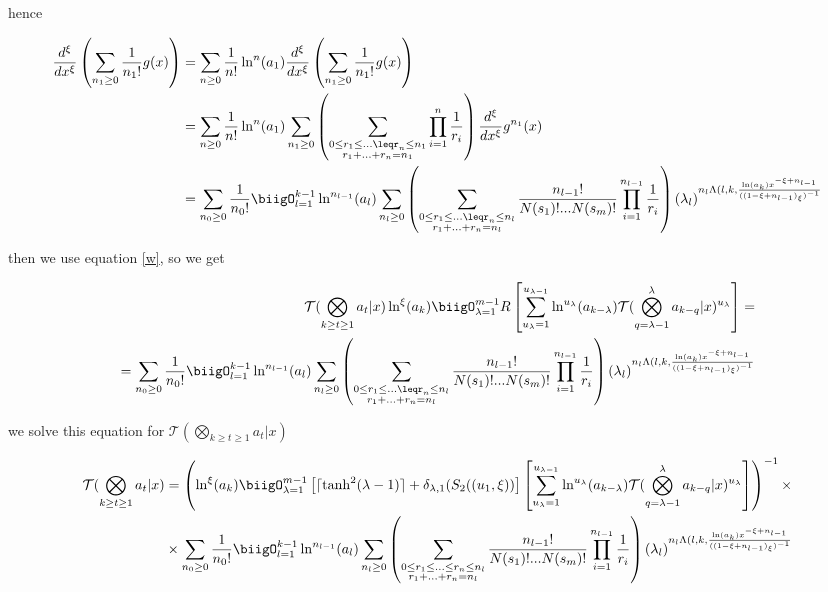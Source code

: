hence

\begin{align}
        \frac{d^\xi}{dx^\xi}\left(\sum_{n_1\geq0}\frac{1}{n_1!}g(x)\right) 
        &=\sum_{n\geq0}\frac{1}{n!}\ln^n(a_1) \frac{d^\xi}{dx^\xi}\left(\sum_{n_1
        \geq0}\frac{1}{n_1!}g(x)\right) \\
        &=\sum_{n\geq 0}\frac{1}{n!}\ln^n(a_1)\sum_{n_1\geq0}
        \left(\sum_{\substack{0\leq r_1 \leq...\leqr_n\leq n_1 
        \\ r_1 +...+r_n = n_1}}\prod_{i=1}^n \frac{1}{r_i}\right)
        \frac{d^\xi}{dx^\xi}g^{n_1}(x) \\
        & =\sum_{n_0\geq 0}\frac{1}{n_0!}\biigO_{l=1}^{k-1}
        \ln^{n_{l-1}}(a_l)
        \sum_{n_l\geq0} \left(\sum_{\substack{0\leq r_1 \leq...\leqr_n\leq
        n_l \\ r_1 +...+r_n = n_l}}\frac{n_{l-1}!}{N(s_1)!...N(s_m)!}
        \prod_{i=1}^{n_{l-1}} \frac{1}{r_i}\right)(\lambda_l)^{n_l \Lambda(l,
        k,\frac{\ln(a_k)x^{-\xi+n_{l-1}}}{((1-\xi + n_{l-1})_\xi)^{-1}}}
\end{align}

then we use equation \ref{w}, so we get

\begin{align}
        \mathcal{T}(\bigotimes_{k \geq t \geq 1}a_t| x) \ln^\xi (a_k)
        \biigO_{\lambda = 1}^{m-1} R\left[\sum_{u_{\lambda}=1}^{u_{\lambda-1}}
        \ln^{u_{\lambda}}(a_{k-\lambda}) \mathcal{T}(\bigotimes_{q = \lambda-1}^\lambda
        a_{k-q} |x)^{u_{\lambda}} \right] = \\=\sum_{n_0\geq 0}\frac{1}{n_0!}\biigO_{l=1}^{k-1}
         \ln^{n_{l-1}}(a_l)
        \sum_{n_l\geq0} \left(\sum_{\substack{0\leq r_1 \leq...\leqr_n\leq n_l 
        \\ r_1 +...+r_n = n_l}}\frac{n_{l-1}!}{N(s_1)!...N(s_m)!}\prod_{i=1}^{n_{l-1}}
        \frac{1}{r_i}\right)(\lambda_l)^{n_l \Lambda(l, k,\frac{\ln(a_k)x^{-\xi+n_{l-1}}}{((1-\xi 
        + n_{l-1})_\xi)^{-1}}}
\end{align}

we solve this equation for \( \mathcal{T}(\bigotimes_{k \geq t \geq 1}a_t| x)\)

\begin{align}
        \mathcal{T}(\bigotimes_{k \geq t \geq 1}a_t| x) &=\left(\ln^\xi (a_k)
        \biigO_{\lambda = 1}^{m-1} \left[ \lceil \tanh^2(\lambda -1)\rceil+\delta_{\lambda,
        1}(S_2((u_1, \xi))\right]\left[\sum_{u_{\lambda}=1}^{u_{\lambda-1}}\ln^{u_{\lambda}}
        (a_{k-\lambda}) \mathcal{T}(\bigotimes_{q = \lambda-1}^\lambda a_{k-q} |x)^{u_{\lambda}}
        \right]\right)^{-1}\times \\ &\times \sum_{n_0\geq 0}\frac{1}{n_0!}\biigO_{l=1}^{k-1}
        \ln^{n_{l-1}}(a_l) \sum_{n_l\geq0} \left(\sum_{\substack{0\leq r_1 \leq...\leq r_n\leq n_l
        \\ r_1 +...+r_n = n_l}}\frac{n_{l-1}!}{N(s_1)!...N(s_m)!}\prod_{i=1}^{n_{l-1}} \frac{1}{r_i}
        \right)(\lambda_l)^{n_l \Lambda(l, k,\frac{\ln(a_k)x^{-\xi+n_{l-1}}}{((1-\xi + n_{l-1})_\xi)^{-1}}}
\end{align}


